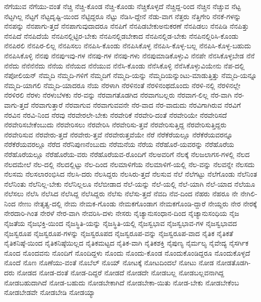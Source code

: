 {ನೆಗೆಯುವ
ನೆಗೆಯು-ವಂತೆ
ನೆಚ್ಚಿ
ನೆಚ್ಚಿ-ಕೊಂಡ
ನೆಚ್ಚಿ-ಕೊಂಡು
ನೆಚ್ಚಿಕೊಳ್ಳದೆ
ನೆಚ್ಚಿದ್ದ-ರಿಂದ
ನೆಚ್ಚಿನ
ನೆಚ್ಚುವ
ನೆಟ್ಟ
ನೆಟ್ಟಗಿಲ್ಲ
ನೆಟ್ಟಗೆ
ನೆಟ್ಟದೃಷ್ಟಿ-ಯಿಂದ
ನೆಟ್ಟಿದ್ದರೂ
ನೆಟ್ಟು
ನೆಡಿಸಿ-ದ್ದೇನೆ
ನೆಡು-ವಾಗ
ನೆತ್ತರು
ನೆತ್ತಿಗೇರಿ
ನೆನಕೆ-ಗಳನ್ನು
ನೆನಪನ್ನು
ನೆನಪಾಗು-ತ್ತದೆ
ನೆನಪಾಗುವುದಾದರೂ
ನೆನಪಿಗೆ
ನೆನಪಿಡಬೇಕುಅನುಕರಣೆ
ನೆನಪಿಡಲು
ನೆನಪಿಡಿ
ನೆನಪಿತ್ತು
ನೆನಪಿದೆ
ನೆನಪಿದೆಯೆ
ನೆನಪಿನಲ್ಲಿಟ್ಟಿರ-ಬೇಕು
ನೆನಪಿನಲ್ಲಿಡಬೇಕಾದ
ನೆನಪಿನಲ್ಲಿಡ-ಬೇಕು
ನೆನಪಿನಲ್ಲಿರಿಸಿ-ಕೊಂಡು
ನೆನಪಿರಲಿ
ನೆನಪಿರ-ಲಿಲ್ಲ
ನೆನಪಿಸಲು
ನೆನಪಿಸಿ-ಕೊಂಡು
ನೆನಪಿಸಿಕೊಳ್ಳ
ನೆನಪಿಸಿ-ಕೊಳ್ಳ-ಬಲ್ಲ
ನೆನಪಿಸಿ-ಕೊಳ್ಳ-ಬಹುದು
ನೆನಪಿಸಿಕೊಳ್ಳಿ
ನೆನಪು
ನೆನಪುಇವು-ಗಳ
ನೆನಪು-ಗಳ
ನೆನಪು-ಗಳು
ನೆನಪುಮಾಡಿಕೊಳ್ಳುವಿ
ನೆನಪೇ
ನೆನಸಿಕೊಳ್ಳಬೇಡ
ನೆನೆ
ನೆನೆದು
ನೆನೆನೆನೆದು
ನೆನೆಯ
ನೆನೆಯದ
ನೆನೆಯುವ
ನೆನೆಸಿ-ಕೊಂಡು
ನೆನೆಸಿಕೊಳ್ಳಿ
ನೆನೆಸಿಕೊಳ್ಳುವಿಯೇನು
ನೆಪ-ದಲ್ಲಿ
ನೆಪೋಲಿಯನ್
ನೆಮ್ಮದಿ
ನೆಮ್ಮದಿ-ಗಳಿಗೆ
ನೆಮ್ಮದಿಗೆ
ನೆಮ್ಮದಿ-ಯನ್ನು
ನೆಮ್ಮದಿಯನ್ನುಂಟು-ಮಾಡುತ್ತಿತ್ತು
ನೆಮ್ಮದಿ-ಯನ್ನೂ
ನೆಮ್ಮದಿ-ಯಾಗಲಿ
ನೆಮ್ಮದಿ-ಯಾದರೂ
ನೆಯ
ನೆರಳಾಗಿ
ನೆರಳಿನಂತೆ
ನೆರಳಿನಂಥದೊಂದು
ನೆರಳಿ-ನಲ್ಲಿ
ನೆರಳಿನಲ್ಲೇ
ನೆರಳಿರಲಿ
ನೆರಳು
ನೆರಳುಬೆಳಕು
ನೆರ-ವನ್ನು
ನೆರವಾಗತೊಡಗಿದ
ನೆರವಾಗಬಲ್ಲರು
ನೆರವಾಗ-ಲಿಲ್ಲ
ನೆರ-ವಾಗಿ
ನೆರ-ವಾಗು-ತ್ತದೆ
ನೆರವಾಗುತ್ತಾರೆ
ನೆರವಾಗುವ
ನೆರವಾಗುವವನೇ
ನೆರ-ವಾದ
ನೆರ-ವಾದುದು
ನೆರವಿಗಾಗಿರುವ
ನೆರವಿಗೆ
ನೆರವಿನ
ನೆರವಿ-ನಿಂದ
ನೆರವು
ನೆರವೇರಲೇ-ಬೇಕು
ನೆರವೇರಿಕೆ
ನೆರವೇರಿ-ದಂತೆ
ನೆರವೇರಿಯೇ
ನೆರವೇರಿಸದೆ
ನೆರವೇರಿಸಬೇಕೆಂಬುದು
ನೆರವೇರಿಸಲು
ನೆರವೇರಿಸಿ
ನೆರವೇರಿಸು-ತ್ತವೆ
ನೆರವೇರಿಸುತ್ತಿದ್ದ
ನೆರವೇರಿಸುತ್ತಿದ್ದರು
ನೆರವೇರಿಸುವ
ನೆರವೇರು-ತ್ತದೆ
ನೆರವೇರು-ತ್ತವೆ
ನೆರವೇರುತ್ತವೆಯೇ
ನೆರೆ
ನೆರೆಕೆರೆಯಲ್ಲೂ
ನೆರೆಕೆರೆಯವರನ್ನೂ
ನೆರೆಕೆರೆಯವರಲ್ಲೂ
ನೆರೆದ
ನೆರೆನಿಪುಣನೆಂಬುದು
ನೆರೆಮನೆಯ
ನೆರೆಯ
ನೆರೆಹೊರೆ-ಯವರನ್ನು
ನೆರೆಹೊರೆಯ
ನೆರೆಹೊರೆಯಲ್ಲೂ
ನೆರೆಹೊರೆಯ-ವರು
ನೆರೆಹೊರೆಯವ-ರೊಂದಿಗೆ
ನೆಲಅವರಿಗೆ
ನೆಲಕ್ಕೆ
ನೆಲಜಲಾಗಸ-ಗಳಲ್ಲಿ
ನೆಲದ
ನೆಲದಮೇಲೆ
ನೆಲ-ದಲ್ಲಿ
ನೆಲದಲ್ಲಿಟ್ಟು
ನೆಲ-ದಿಂದ
ನೆಲಮಾಳಿಗೆಯ
ನೆಲಮಾಳಿಗೆ-ಯಲ್ಲಿ
ನೆಲ-ವನ್ನು
ನೆಲವನ್ನೇ
ನೆಲಸದು
ನೆಲಸಮ
ನೆಲಸಲಾರಂಭಿಸಿದ
ನೆಲಸಿ-ದರು
ನೆಲಸಿದ್ದರು
ನೆಲಸಿರು-ತ್ತದೆ
ನೆಲಸುವ
ನೆಲೆ
ನೆಲೆಗಟ್ಟು
ನೆಲೆಗೊಂಡು
ನೆಲೆನಿಂತ
ನೆಲೆನಿಂತು
ನೆಲೆನಿಲ್ಲ-ಬೇಕು
ನೆಲೆನಿಲ್ಲಲೂ
ನೆಲೆಬೀಡಾದ
ನೆಲೆ-ಯನ್ನು
ನೆಲೆ-ಯಲ್ಲಿ
ನೆಲೆ-ಯಾಗಿ
ನೆಲೆ-ಯಾದ
ನೆಲೆಯೂ
ನೆಲೆಸಲು
ನೆಲೆಸಿ
ನೆಲೆಸಿದ
ನೆಲೆಸಿದ್ದ
ನೆಲೆಸಿದ್ದರು
ನೆಲೆಸು
ನೆಲೆಸು-ತ್ತದೆ
ನೆವದಿ
ನೆವ-ದಿಂದ
ನೆಹರು
ನೆಹರೂ
ನೇ
ನೇಗಿಲಿ-ನಿಂದ
ನೇಣು
ನೇತೃತ್ವ-ದಲ್ಲಿ
ನೇಮ
ನೇಮಕ-ಗೊಂಡು
ನೇಮಕಗೊಂಡಾಗ
ನೇಮಕಗೊಂಡಿ-ದ್ದಾರೆ
ನೇಯ್ದರು
ನೇರ
ನೇರಕ್ಕೆ
ನೇರದಾರಿ-ಗಿಂತ
ನೇರಳೆ
ನೇರ-ವಾಗಿ
ನೇವರಿಸಿ-ದಳು
ನೇಸರು
ನೈಚ್ಯಾನುಸಂಧಾನ-ದಿಂದ
ನೈಚ್ಯಾನುಸಂಧಿಯ
ನೈಜ
ನೈಜತೆಯ
ನೈಜಭಕ್ತಿ-ಯಿಂದ
ನೈಜಸ್ಥಿತಿ-ಯನ್ನು
ನೈಜಸ್ಥಿತಿ-ಯಲ್ಲಿ
ನೈಜಸ್ವಭಾವ
ನೈಜಸ್ವಭಾವ-ಗಳ
ನೈಜಸ್ವಭಾವದ
ನೈಜಸ್ವರೂಪ
ನೈಜಸ್ವರೂಪ-ಗಳನ್ನು
ನೈಜಸ್ವರೂಪದ
ನೈಜಸ್ವರೂಪ-ವನ್ನು
ನೈಜಸ್ವರೂಪ-ವಾದ
ನೈತಿಕ
ನೈತಿಕತೆ
ನೈತಿಕನಿಷ್ಠೆ-ಯಿಂದ
ನೈತಿಕನಿಷ್ಠೆಯಿಲ್ಲದ
ನೈತಿಕಮಟ್ಟದ
ನೈತಿಕ-ವಾಗಿ
ನೈತಿಕಶಕ್ತಿ
ನೈಪುಣ್ಯ
ನೈರ್ಮಲ್ಯ
ನೈವೇದ್ಯ
ನೈಸರ್ಗಿಕ
ನೊಂದ
ನೊಂದವನು
ನೊಂದಿಗೆ
ನೊಂದಿದ್ದಳು
ನೊಂದು
ನೊಂದು-ಕೊಂಡ
ನೊಂದುಕೊಂಡಿದ್ದರೂ
ನೊಂದುಕೊಳ್ಳದೆ
ನೊಂದೆ
ನೊಣ
ನೊಣೆಯು-ವಂತೆ
ನೊಬೆಲ್
ನೊಯ್
ನೋಟಕ್ಕೆ
ನೋಟದಿಂದಲೆ
ನೋಟು
ನೋಡ
ನೋಡತೊಡಗಿ-ದರು
ನೋಡದ
ನೋಡ-ದಂತೆ
ನೋಡ-ದಿದ್ದರೆ
ನೋಡದೆ
ನೋಡದೇ
ನೋಡಬಲ್ಲ
ನೋಡಬಲ್ಲವನಾಗಿದ್ದ
ನೋಡಬಹುದಾಗಿದೆ
ನೋಡ-ಬಹುದು
ನೋಡಬೇಕಾಗಿದೆ
ನೋಡಬೇಕಾ-ಯಿತು
ನೋಡ-ಬೇಕು
ನೋಡಬೇಕೆಂಬ
ನೋಡಬೇಡವೇ
ನೋಡಬೇಡಿ
ನೋಡಯ್ಯಾ
}

